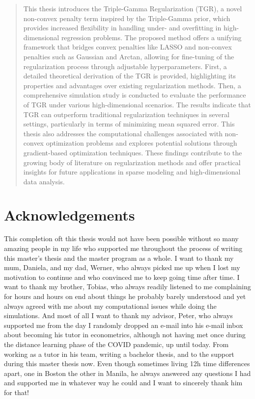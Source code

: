 \documentclass[12pt,a4paper]{article}
\begin{document}
\begin{abstract}
This thesis introduces the Triple-Gamma Regularization (TGR), a novel non-convex penalty term inspired by the Triple-Gamma prior, which provides increased flexibility in handling under- and overfitting in high-dimensional regression problems. The proposed method offers a unifying framework that bridges convex penalties like LASSO and non-convex penalties such as Gaussian and Arctan, allowing for fine-tuning of the regularization process through adjustable hyperparameters. First, a detailed theoretical derivation of the TGR is provided, highlighting its properties and advantages over existing regularization methods. Then, a comprehensive simulation study is conducted to evaluate the performance of TGR under various high-dimensional scenarios. The results indicate that TGR can outperform traditional regularization techniques in several settings, particularly in terms of minimizing mean squared error. This thesis also addresses the computational challenges associated with non-convex optimization problems and explores potential solutions through gradient-based optimization techniques. These findings contribute to the growing body of literature on regularization methods and offer practical insights for future applications in sparse modeling and high-dimensional data analysis.
\end{abstract}

\clearpage

\section*{Acknowledgements}
\thispagestyle{empty}

This completion oft this thesis would not have been possible without so many amazing people in my life who supported me throughout the process of writing this master's thesis and the master program as a whole. I want to thank my mum, Daniela, and my dad, Werner, who always picked me up when I lost my motivation to continue and who convinced me to keep going time after time. I want to thank my brother, Tobias, who always readily listened to me complaining for hours and hours on end about things he probably barely understood and yet always agreed with me about my computational issues while doing the simulations. And most of all I want to thank my advisor, Peter, who always supported me from the day I randomly dropped an e-mail into his e-mail inbox about becoming his tutor in econometrics, although not having met once during the distance learning phase of the COVID pandemic, up until today. From working as a tutor in his team, writing a bachelor thesis, and to the support during this master thesis now. Even though sometimes living 12h time differences apart, one in Boston the other in Manila, he always answered any questions I had and supported me in whatever way he could and I want to sincerely thank him for that!  
\end{document}
